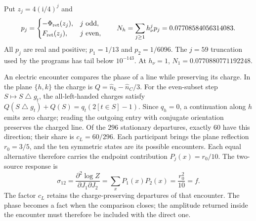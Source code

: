 \documentclass[aps,prx,onecolumn,10pt,notitlepage,nofootinbib,longbibliography]{revtex4-2}
\numberwithin{equation}{section}
\numberwithin{table}{section}
\newcommand{\ii}{\mathrm i}
\newcommand{\Fret}{F_{\mathrm{ret}}}
\newcommand{\hover}{h_\nu}
\newcommand{\Phis}{\Phi_{\rm ret}}
\begin{document}
Put $z_j=4(\ii/4)^j$ and
\begin{equation}
 p_j=\begin{cases}-\Phis(z_j),&j\text{ odd},\\ \Fret(z_j),&j\text{ even},\end{cases}
 \qquad N_h=\sum_{j\geq1}\hover^jp_j=0.07708584056314083.
 \label{eq:Nh}
\end{equation}
All $p_j$ are real and positive; $p_1=1/13$ and $p_2=1/6096$. The $j=59$ truncation used by the programs has tail below $10^{-143}$. At $\hover=1$, $N_1=0.0770880771192248$.

An electric encounter compares the phase of a line while preserving its charge. In the plane $\{h,k\}$ the charge is $Q=\widehat n_k-\widehat n_C/3$. For the even-subset step $S\mapsto S\mathbin\triangle g_t$, the all-left-handed charges satisfy $Q(S\mathbin\triangle g_t)+Q(S)=q_t(2[t\in S]-1)$. Since $q_h=0$, a continuation along $h$ emits zero charge; reading the outgoing entry with conjugate orientation preserves the charged line. Of the $296$ stationary departures, exactly $60$ have this direction; their share is $c_L=60/296$. Each participant brings the plane reflection $r_0=3/5$, and the ten symmetric states are its possible encounters. Each equal alternative therefore carries the endpoint contribution $P_j(x)=r_0/10$. The two-source response is
\begin{equation}
 \sigma_{12}=\frac{\partial^2\log Z}{\partial J_1\partial J_2}
 =\sum_xP_1(x)P_2(x)=\frac{r_0^2}{10}=f.
 \label{eq:electrictwosource}
\end{equation}
The factor $c_L$ retains the charge-preserving departures of that encounter. The phase becomes a fact when the comparison closes; the amplitude returned inside the encounter must therefore be included with the direct one.
\end{document}
